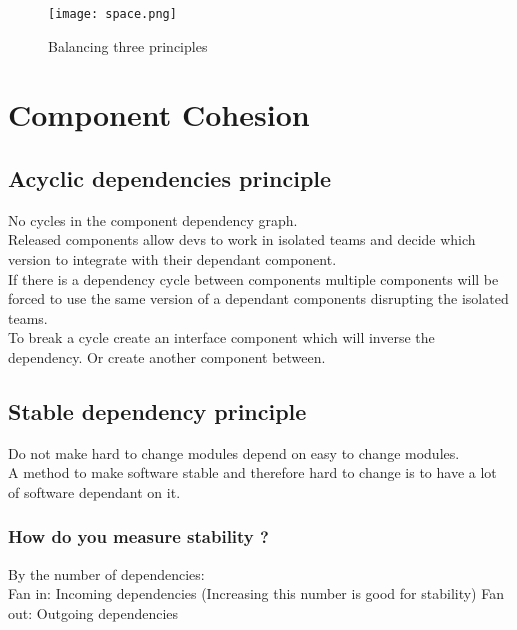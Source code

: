 \documentclass[11pt]{scrartcl} %
\begin{document}
\begin{figure}[h] %
	\centering
	\texttt{[image: space.png]} %
	\caption{Balancing three principles}
\end{figure}

\section{Component Cohesion}

\subsection{Acyclic dependencies principle}

No cycles in the component dependency graph.\\

Released components allow devs to work in isolated teams and decide
which version to integrate with their dependant component.\\

If there is a dependency cycle between components multiple components
will be forced to use the same version of a dependant components
disrupting the isolated teams.\\

To break a cycle create an interface component which will inverse the
dependency. Or create another component between.

\subsection{Stable dependency principle}

Do not make hard to change modules depend on easy to change modules.\\

A method to make software stable and therefore hard to change is to have
a lot of software dependant on it.

\subsubsection{How do you measure stability ?}

By the number of dependencies:\\

Fan in: Incoming dependencies (Increasing this number is good for
stability) Fan out: Outgoing dependencies\\
\end{document}
